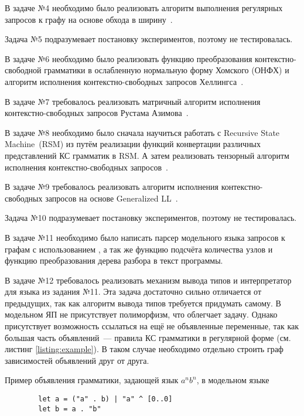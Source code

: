 В задаче №4 необходимо было реализовать алгоритм выполнения регулярных запросов к графу на основе обхода в ширину~\cite{elekesGraphBLASSolutionSIGMOD2020}.

Задача №5 подразумевает постановку экспериментов, поэтому не тестировалась.

В задаче №6 необходимо было реализовать функцию преобразования контекстно-свободной грамматики в ослабленную нормальную форму Хомского (ОНФХ) и алгоритм исполнения контекстно-свободных запросов Хеллингса~\cite{hellingsConjunctiveContextFreePath2014}.

В задаче №7 требовалось реализовать матричный алгоритм исполнения контекстно-свободных запросов Рустама Азимова~\cite{azimovContextfreePathQuerying2018}.

В задаче №8 необходимо было сначала научиться работать с Recursive State Machine~(RSM) из \pyformlang{} путём реализации функций конвертации различных представлений КС грамматик в RSM.
А затем реализовать тензорный алгоритм исполнения контекстно-свободных запросов~\cite{orachevContextFreePathQuerying2020, shemetovaOneAlgorithmEvaluate2021}.

В задаче №9 требовалось реализовать алгоритм исполнения контекстно-свободных запросов на основе Generalized LL~\cite{abzalovGLLbasedContextFreePath2023}.

Задача №10 подразумевает постановку экспериментов, поэтому не тестировалась.

В задаче №11 необходимо было написать парсер модельного языка запросов к графам с использованием \antlr{}, а так же функцию подсчёта количества узлов и функцию преобразования дерева разбора в текст программы.

В задаче №12 требовалось реализовать механизм вывода типов и интерпретатор для языка из задания №11.
Эта задача достаточно сильно отличается от предыдущих, так как алгоритм вывода типов требуется придумать самому.
В модельном ЯП не присутствует полиморфизм, что облегчает задачу.
Однако присутствует возможность ссылаться на ещё не объявленные переменные, так как большая часть объявлений~--- правила КС грамматики в регулярной форме (см. листинг \ref{listing:example}).
В таком случае необходимо отдельно строить граф зависимостей объявлений друг от друга.

\begin{listing}
    \caption{Пример объявления грамматики, задающей язык $a^n b^n$, в модельном языке}
    \begin{verbatim}
        let a = ("a" . b) | "a" ^ [0..0]
        let b = a . "b"
        \end{verbatim}
    \label{listing:example}
\end{listing}

